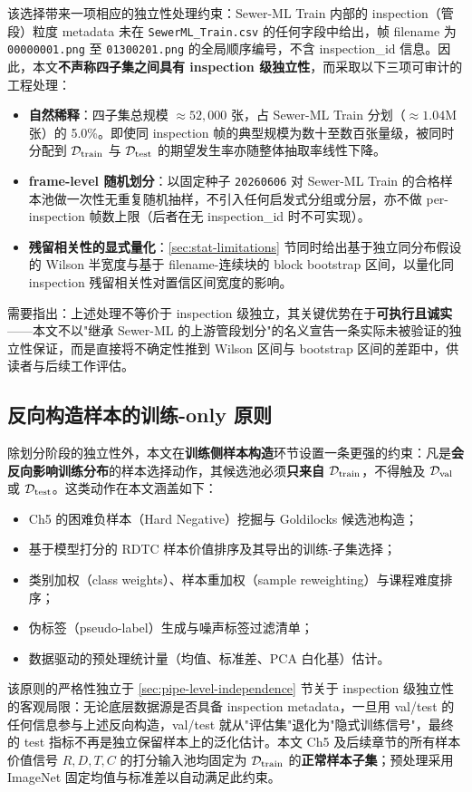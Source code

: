 \documentclass[UTF8,openany,12pt]{ctexbook}
\begin{document}
该选择带来一项相应的独立性处理约束：Sewer-ML Train 内部的 inspection（管段）粒度 metadata 未在 \texttt{SewerML\_Train.csv} 的任何字段中给出，帧 filename 为 \texttt{00000001.png} 至 \texttt{01300201.png} 的全局顺序编号，不含 inspection\_id 信息。因此，本文\textbf{不声称四子集之间具有 inspection 级独立性}，而采取以下三项可审计的工程处理：
\begin{itemize}[leftmargin=2em,nosep]
\item \textbf{自然稀释}：四子集总规模 $\approx 52{,}000$ 张，占 Sewer-ML Train 分划（$\approx 1.04$M 张）的 5.0\%。即使同 inspection 帧的典型规模为数十至数百张量级，被同时分配到 $\mathcal{D}_{\rm train}$ 与 $\mathcal{D}_{\rm test}$ 的期望发生率亦随整体抽取率线性下降。
\item \textbf{frame-level 随机划分}：以固定种子 \texttt{20260606} 对 Sewer-ML Train 的合格样本池做一次性无重复随机抽样，不引入任何启发式分组或分层，亦不做 per-inspection 帧数上限（后者在无 inspection\_id 时不可实现）。
\item \textbf{残留相关性的显式量化}：\ref{sec:stat-limitations} 节同时给出基于独立同分布假设的 Wilson 半宽度与基于 filename-连续块的 block bootstrap 区间，以量化同 inspection 残留相关性对置信区间宽度的影响。
\end{itemize}

需要指出：上述处理不等价于 inspection 级独立，其关键优势在于\textbf{可执行且诚实}——本文不以"继承 Sewer-ML 的上游管段划分"的名义宣告一条实际未被验证的独立性保证，而是直接将不确定性推到 Wilson 区间与 bootstrap 区间的差距中，供读者与后续工作评估。

\subsection{反向构造样本的训练-only 原则}
\label{sec:train-only-construction}
除划分阶段的独立性外，本文在\textbf{训练侧样本构造}环节设置一条更强的约束：凡是\textbf{会反向影响训练分布}的样本选择动作，其候选池必须\textbf{只来自} $\mathcal{D}_{\rm train}$，不得触及 $\mathcal{D}_{\rm val}$ 或 $\mathcal{D}_{\rm test}$。这类动作在本文涵盖如下：
\begin{itemize}[leftmargin=2em,nosep]
\item Ch5 的困难负样本（Hard Negative）挖掘与 Goldilocks 候选池构造；
\item 基于模型打分的 RDTC 样本价值排序及其导出的训练-子集选择；
\item 类别加权（class weights）、样本重加权（sample reweighting）与课程难度排序；
\item 伪标签（pseudo-label）生成与噪声标签过滤清单；
\item 数据驱动的预处理统计量（均值、标准差、PCA 白化基）估计。
\end{itemize}
该原则的严格性独立于 \ref{sec:pipe-level-independence} 节关于 inspection 级独立性的客观局限：无论底层数据源是否具备 inspection metadata，一旦用 val/test 的任何信息参与上述反向构造，val/test 就从"评估集"退化为"隐式训练信号"，最终的 test 指标不再是独立保留样本上的泛化估计。本文 Ch5 及后续章节的所有样本价值信号 $R, D, T, C$ 的打分输入池均固定为 $\mathcal{D}_{\rm train}$ 的\textbf{正常样本子集}；预处理采用 ImageNet 固定均值与标准差以自动满足此约束。
\end{document}
